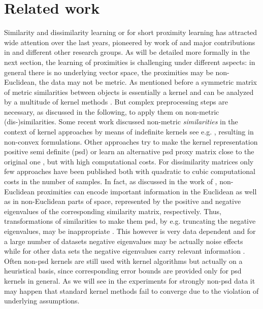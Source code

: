 \documentclass[twoside,11pt]{article}
\begin{document}
\section{Related work}
Similarity and dissimilarity learning or for short proximity learning has attracted wide attention over the last years, pioneered by work of \cite{Goldfarb1984575} and
major contributions in \cite{Pekalska2005a} and different other research groups. As will be detailed more formally in the next section,
the learning of proximities is challenging under different aspects: in general there is no underlying vector space, the proximities may be non-Euclidean,
the data may not be metric. As mentioned before a symmetric matrix of metric similarities between objects is essentially a kernel and can be analyzed
by a multitude of kernel methods \cite{Cristianini2004a}.  But complex preprocessing steps are necessary, as discussed in the following, 
to apply them on non-metric (dis-)similarities. Some recent work discussed non-metric \emph{similarities} in the context of kernel approaches
by means of indefinite kernels see e.g. \cite{Liwicki20121624,Haasdonk2009a}, resulting in non-convex formulations. Other approaches try to make the
kernel representation positive semi definite (psd) or learn an alternative psd proxy matrix close to the original one
\cite{DBLP:journals/jmlr/ChenGGRC09,DBLP:conf/icml/ChenGR09}, but with high computational costs. For dissimilarity matrices only few
approaches have been published \cite{Lu30082005,DBLP:journals/siammax/BrickellDST08} both with quadratic to cubic computational costs
in the number of samples. In fact, as discussed in the work of \cite{Pekalska2005a},
non-Euclidean proximities can encode important information in the Euclidean
as well as in non-Euclidean parts of space,
represented by the positive and negative eigenvalues
of the corresponding similarity matrix, respectively.
Thus, transformations of similarities to make them psd,
by e.g. truncating the negative eigenvalues,
may be inappropriate \cite{DBLP:conf/sspr/PekalskaDGB04}.
This however is very data dependent and for a large number of datasets negative eigenvalues may be actually noise effects
while for other data sets the negative eigenvalues carry relevant information \cite{DBLP:phd/de/Laub2004,DBLP:journals/pr/LaubRBM06}.
Often non-psd kernels are still used with kernel algorithms but actually on a heuristical basis, since corresponding error bounds are provided 
only for psd kernels in general. As we will see in the experiments for strongly non-psd data it may happen that standard kernel methods
fail to converge due to the violation of underlying assumptions.
\end{document}
